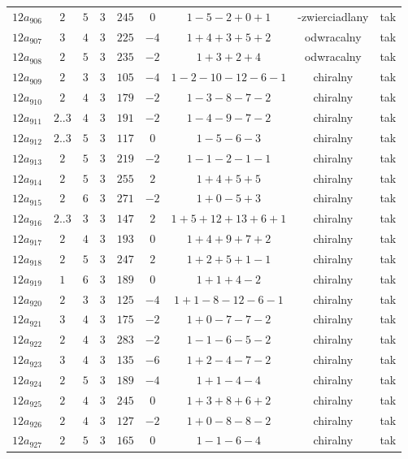 \begin{longtable}{ccccccccc}
$12a_{906}$ & $2$ & $5$ & $3$ & $245$ & $0$ & $1-5-2+0+1$ & -zwierciadlany & tak \\
$12a_{907}$ & $3$ & $4$ & $3$ & $225$ & $-4$ & $1+4+3+5+2$ & odwracalny & tak \\
$12a_{908}$ & $2$ & $5$ & $3$ & $235$ & $-2$ & $1+3+2+4$ & odwracalny & tak \\
$12a_{909}$ & $2$ & $3$ & $3$ & $105$ & $-4$ & $1-2-10-12-6-1$ & chiralny & tak \\
$12a_{910}$ & $2$ & $4$ & $3$ & $179$ & $-2$ & $1-3-8-7-2$ & chiralny & tak \\
$12a_{911}$ & $2..3$ & $4$ & $3$ & $191$ & $-2$ & $1-4-9-7-2$ & chiralny & tak \\
$12a_{912}$ & $2..3$ & $5$ & $3$ & $117$ & $0$ & $1-5-6-3$ & chiralny & tak \\
$12a_{913}$ & $2$ & $5$ & $3$ & $219$ & $-2$ & $1-1-2-1-1$ & chiralny & tak \\
$12a_{914}$ & $2$ & $5$ & $3$ & $255$ & $2$ & $1+4+5+5$ & chiralny & tak \\
$12a_{915}$ & $2$ & $6$ & $3$ & $271$ & $-2$ & $1+0-5+3$ & chiralny & tak \\
$12a_{916}$ & $2..3$ & $3$ & $3$ & $147$ & $2$ & $1+5+12+13+6+1$ & chiralny & tak \\
$12a_{917}$ & $2$ & $4$ & $3$ & $193$ & $0$ & $1+4+9+7+2$ & chiralny & tak \\
$12a_{918}$ & $2$ & $5$ & $3$ & $247$ & $2$ & $1+2+5+1-1$ & chiralny & tak \\
$12a_{919}$ & $1$ & $6$ & $3$ & $189$ & $0$ & $1+1+4-2$ & chiralny & tak \\
$12a_{920}$ & $2$ & $3$ & $3$ & $125$ & $-4$ & $1+1-8-12-6-1$ & chiralny & tak \\
$12a_{921}$ & $3$ & $4$ & $3$ & $175$ & $-2$ & $1+0-7-7-2$ & chiralny & tak \\
$12a_{922}$ & $2$ & $4$ & $3$ & $283$ & $-2$ & $1-1-6-5-2$ & chiralny & tak \\
$12a_{923}$ & $3$ & $4$ & $3$ & $135$ & $-6$ & $1+2-4-7-2$ & chiralny & tak \\
$12a_{924}$ & $2$ & $5$ & $3$ & $189$ & $-4$ & $1+1-4-4$ & chiralny & tak \\
$12a_{925}$ & $2$ & $4$ & $3$ & $245$ & $0$ & $1+3+8+6+2$ & chiralny & tak \\
$12a_{926}$ & $2$ & $4$ & $3$ & $127$ & $-2$ & $1+0-8-8-2$ & chiralny & tak \\
$12a_{927}$ & $2$ & $5$ & $3$ & $165$ & $0$ & $1-1-6-4$ & chiralny & tak \\

\end{longtable}
